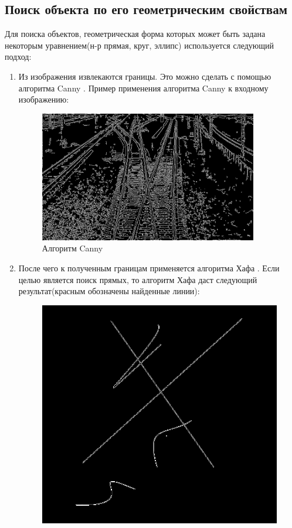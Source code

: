 \subsection{Поиск объекта по его геометрическим свойствам}
Для поиска объектов, геометрическая форма которых может быть задана некоторым уравнением(н-р прямая, круг, эллипс) используется следующий подход:
\begin{enumerate}
	\item Из изображения извлекаются границы. Это можно сделать с помощью алгоритма Canny \cite{b:canny}. \newline
	Пример применения алгоритма Canny к входному изображению:
	\begin{figure}[!h]
		\centering
		\includegraphics[width=0.9\textwidth]{pictures/canny_res.png}
		\caption[Применение алгоритма Canny]{Алгоритм Canny}
		\label{fig:cannyres}
	\end{figure}
	\item После чего к полученным границам применяется алгоритма Хафа \cite{b:hough_transform}. Если целью является поиск прямых, то алгоритм Хафа даст следующий результат(красным обозначены найденные линии):
	\begin{figure}[!h]
		\centering
		\begin{minipage}{0.45\textwidth}
			\centering
			\includegraphics[width=0.7\linewidth]{pictures/canny_ex}

\end{minipage}
\end{figure}
\end{enumerate}
